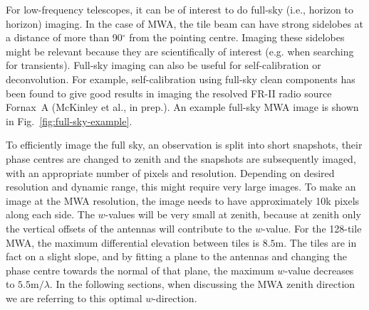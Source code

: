 \documentclass[useAMS,usenatbib]{mn2e}
\newcommand{\degree}{\ensuremath{^{\circ}}\xspace}
\begin{document}
For low-frequency telescopes, it can be of interest to do full-sky (i.e., horizon to horizon) imaging. In the case of MWA, the tile beam can have strong sidelobes at a distance of more than 90\degree from the pointing centre. Imaging these sidelobes might be relevant because they are scientifically of interest (e.g. when searching for transients). Full-sky imaging can also be useful for self-calibration or deconvolution. For example, self-calibration using full-sky clean components has been found to give good results in imaging the resolved FR-II radio source Fornax~A (McKinley et al., in prep.). An example full-sky MWA image is shown in Fig.~\ref{fig:full-sky-example}.

To efficiently image the full sky, an observation is split into short snapshots, their phase centres are changed to zenith and the snapshots are subsequently imaged, with an appropriate number of pixels and resolution. Depending on desired resolution and dynamic range, this might require very large images. To make an image at the MWA resolution, the image needs to have approximately 10k pixels along each side. The $w$-values will be very small at zenith, because at zenith only the vertical offsets of the antennas will contribute to the $w$-value. For the 128-tile MWA, the maximum differential elevation between tiles is $8.5$m. The tiles are in fact on a slight slope, and by fitting a plane to the antennas and changing the phase centre towards the normal of that plane, the maximum $w$-value decreases to $5.5\textrm{m} / \lambda$. In the following sections, when discussing the MWA zenith direction we are referring to this optimal $w$-direction.
\end{document}
